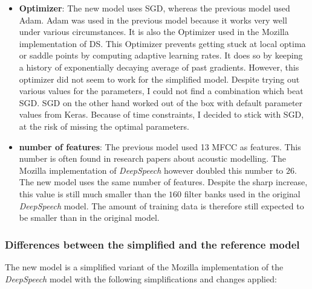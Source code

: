 \begin{itemize}
	\item \textbf{Optimizer}: The new model uses \ac{SGD}, whereas the previous model used Adam. Adam was used in the previous model because it works very well under various circumstances. It is also the Optimizer used in the Mozilla implementation of \ac{DS}. This Optimizer prevents getting stuck at local optima or saddle points by computing adaptive learning rates. It does so by keeping a history of exponentially decaying average of past gradients. However, this optimizer did not seem to work for the simplified model. Despite trying out various values for the parameters, I could not find a combination which beat \ac{SGD}. \ac{SGD} on the other hand worked out of the box with default parameter values from Keras. Because of time constraints, I decided to stick with \ac{SGD}, at the risk of missing the optimal parameters.
	\item \textbf{number of features}: The previous model used 13 \ac{MFCC} as features. This number is often found in research papers about acoustic modelling. The Mozilla implementation of \textit{DeepSpeech} however doubled this number to $26$. The new model uses the same number of features. Despite the sharp increase, this value is still much smaller than the $160$ filter banks used in the original \textit{DeepSpeech} model. The amount of training data is therefore still expected to be smaller than in the original model.
\end{itemize}

\subsubsection{Differences between the simplified and the reference model}
The new model is a simplified variant of the Mozilla implementation of the \textit{DeepSpeech} model with the following simplifications and changes applied:

